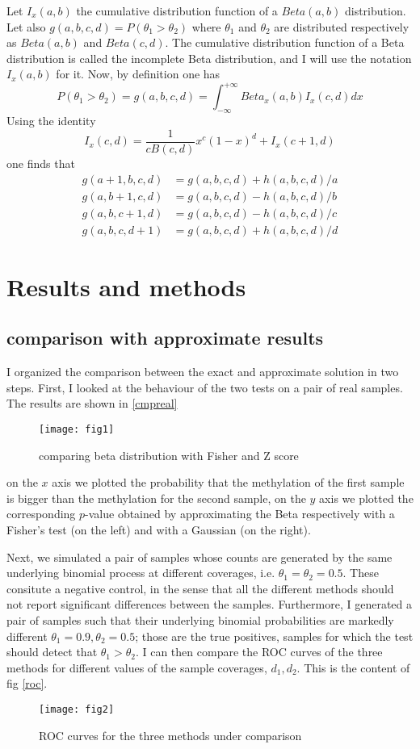 \documentclass[11pt]{amsart}
\begin{document}
Let $I_x(a,b)$ the cumulative distribution function of a $Beta(a,b)$ distribution. Let also $g(a,b,c,d)=P(\theta_1>\theta_2)$ where $\theta_1$ and $\theta_2$ are distributed respectively as $Beta(a,b)$ and $Beta(c,d)$. The cumulative distribution function of a Beta distribution is called the incomplete Beta distribution, and I will use the notation $I_x(a,b)$ for it. Now, by definition one has \[P(\theta_1>\theta_2)=g(a,b,c,d)=\int_{-\infty}^{+\infty} Beta_x(a,b)I_x(c,d) dx\]
Using the identity \[I_x(c,d)=\frac{1}{cB(c,d)}x^c(1-x)^d+I_x(c+1,d)\] one finds that 
\begin{align}
g(a+1,b,c,d) &= g(a,b,c,d) + h(a,b,c,d)/a \\
g(a,b+1,c,d) &= g(a,b,c,d) - h(a,b,c,d)/b \\
g(a,b,c+1,d) &= g(a,b,c,d) - h(a,b,c,d)/c \\
g(a,b,c,d+1) &= g(a,b,c,d) + h(a,b,c,d)/d 
\end{align}

\section{Results and methods} 
\subsection{comparison with approximate results}
I organized the comparison between the exact and approximate solution in two steps. First,
I looked at the behaviour of the two tests on a pair of real samples. The results are shown in \ref{cmpreal}
\begin{figure}[h]
\caption{comparing beta distribution with Fisher and Z score}
\texttt{[image: fig1]}
\end{figure}\label{cmpreal}
on the $x$ axis we plotted the probability that the methylation of the first sample is bigger than the methylation for the second sample, on the $y$ axis we plotted the corresponding $p$-value obtained by approximating the Beta respectively with a Fisher's test (on the left) and with a Gaussian (on the right).

Next, we simulated a pair of samples whose counts are generated by the same underlying binomial process at different coverages, i.e. $\theta_1=\theta_2=0.5$. These consitute a negative control, in the sense that all the different methods should not report significant differences between the samples. Furthermore, I generated a pair of samples such that their underlying binomial probabilities are markedly different $\theta_1=0.9,\theta_2=0.5$; those are the true positives, samples for which the test should detect that $\theta_1>\theta_2$. I can then compare the ROC curves of the three methods for different values of the sample coverages, $d_1,d_2$. 
This is the content of fig \ref{roc}.
\begin{figure}[h]
\caption{ROC curves for the three methods under comparison}
\texttt{[image: fig2]}
\end{figure}\label{roc}
\end{document}
